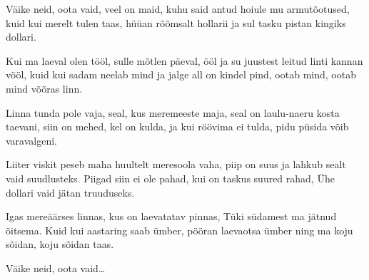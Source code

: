 V\"aike neid, oota vaid,
veel on maid, kuhu said
antud hoiule mu armut\~ootused,
kuid kui merelt tulen taas,
h\"u\"uan r\~o\~omsalt hollarii
ja sul tasku pistan kingiks dollari.

Kui ma laeval olen t\"o\"ol,
sulle m\~otlen p\"aeval, \"o\"ol
ja su juustest leitud linti kannan v\"o\"ol,
kuid kui sadam neelab mind
ja jalge all on kindel pind,
ootab mind, ootab mind v\~o\~oras linn.

Linna tunda pole vaja,
seal, kus meremeeste maja,
seal on laulu-naeru kosta taevani,
siin on mehed, kel on kulda,
ja kui r\"o\"ovima ei tulda,
pidu p\"usida v\~oib varavalgeni.

Liiter viskit peseb maha
huultelt meresoola vaha,
piip on suus ja lahkub sealt vaid suudlusteks.
Piigad siin ei ole pahad,
kui on taskus suured rahad,
\"Uhe dollari vaid j\"atan truuduseks.

Igas mere\"a\"arses linnas,
kus on laevatatav pinnas,
T\"uki s\"udamest ma j\"atnud \~oitsema.
Kuid kui aastaring saab \"umber,
p\"o\"oran laevaotsa \"umber
ning ma koju s\~oidan, koju s\~oidan taas.

V\"aike neid, oota vaid\ldots